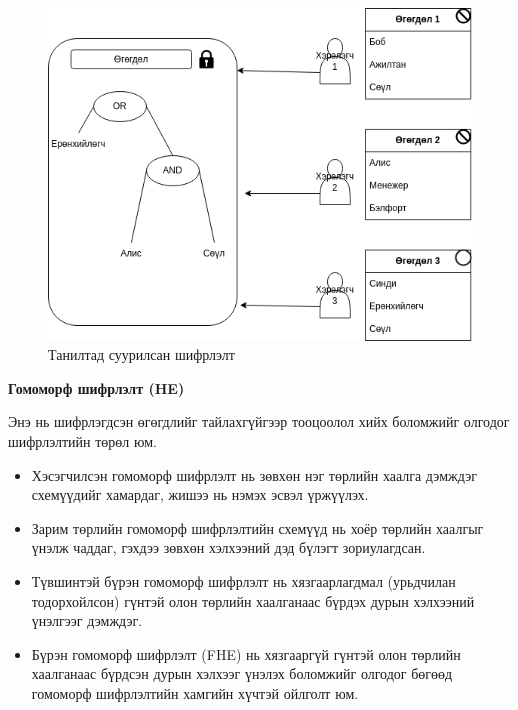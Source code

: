 \begin{figure}[ht]
    \centering
    \includegraphics[scale=0.6]{Figures/cp-abe.drawio.png}
    \caption[IBE]{Танилтад суурилсан шифрлэлт}
    \label{fig:cp-abe}
\end{figure}

\textbf{Гомоморф шифрлэлт (HE)}

Энэ нь шифрлэгдсэн өгөгдлийг тайлахгүйгээр тооцоолол хийх боломжийг олгодог шифрлэлтийн төрөл юм.

\begin{itemize}
    \item Хэсэгчилсэн гомоморф шифрлэлт нь зөвхөн нэг төрлийн хаалга дэмждэг схемүүдийг хамардаг, жишээ нь нэмэх эсвэл үржүүлэх.
    \item Зарим төрлийн гомоморф шифрлэлтийн схемүүд нь хоёр төрлийн хаалгыг үнэлж чаддаг, гэхдээ зөвхөн хэлхээний дэд бүлэгт зориулагдсан.
    \item Түвшинтэй бүрэн гомоморф шифрлэлт нь хязгаарлагдмал (урьдчилан тодорхойлсон) гүнтэй олон төрлийн хаалганаас бүрдэх дурын хэлхээний үнэлгээг дэмждэг.
    \item Бүрэн гомоморф шифрлэлт (FHE) нь хязгааргүй гүнтэй олон төрлийн хаалганаас бүрдсэн дурын хэлхээг үнэлэх боломжийг олгодог бөгөөд гомоморф шифрлэлтийн хамгийн хүчтэй ойлголт юм.
\end{itemize}


